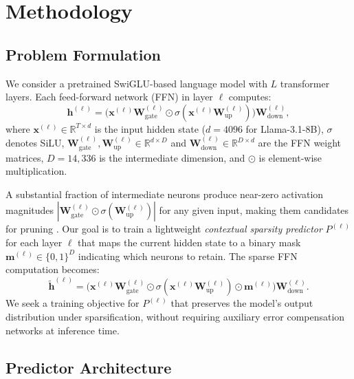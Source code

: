 \section{Methodology}
\label{sec:method}

\subsection{Problem Formulation}
\label{sec:method:formulation}

We consider a pretrained SwiGLU-based language model with $L$ transformer layers.
Each feed-forward network (FFN) in layer $\ell$ computes:
\begin{equation}
\mathbf{h}^{(\ell)} = \bigl(\mathbf{x}^{(\ell)} \mathbf{W}_{\text{gate}}^{(\ell)} \odot \sigma(\mathbf{x}^{(\ell)} \mathbf{W}_{\text{up}}^{(\ell)})\bigr) \mathbf{W}_{\text{down}}^{(\ell)},
\label{eq:swiglu}
\end{equation}
where $\mathbf{x}^{(\ell)} \in \mathbb{R}^{T \times d}$ is the input hidden state ($d{=}4096$ for Llama-3.1-8B), $\sigma$ denotes SiLU, $\mathbf{W}_{\text{gate}}^{(\ell)}, \mathbf{W}_{\text{up}}^{(\ell)} \in \mathbb{R}^{d \times D}$ and $\mathbf{W}_{\text{down}}^{(\ell)} \in \mathbb{R}^{D \times d}$ are the FFN weight matrices, $D{=}14{,}336$ is the intermediate dimension, and $\odot$ is element-wise multiplication.

A substantial fraction of intermediate neurons produce near-zero activation magnitudes $|\mathbf{W}_{\text{gate}}^{(\ell)} \odot \sigma(\mathbf{W}_{\text{up}}^{(\ell)})|$ for any given input, making them candidates for pruning \cite{placeholder_teal,placeholder_dejavu}.
Our goal is to train a lightweight \emph{contextual sparsity predictor} $P^{(\ell)}$ for each layer $\ell$ that maps the current hidden state to a binary mask $\mathbf{m}^{(\ell)} \in \{0,1\}^D$ indicating which neurons to retain.
The sparse FFN computation becomes:
\begin{equation}
\tilde{\mathbf{h}}^{(\ell)} = \bigl(\mathbf{x}^{(\ell)} \mathbf{W}_{\text{gate}}^{(\ell)} \odot \sigma(\mathbf{x}^{(\ell)} \mathbf{W}_{\text{up}}^{(\ell)}) \odot \mathbf{m}^{(\ell)}\bigr) \mathbf{W}_{\text{down}}^{(\ell)}.
\label{eq:sparse_ffn}
\end{equation}
We seek a training objective for $P^{(\ell)}$ that preserves the model's output distribution under sparsification, without requiring auxiliary error compensation networks at inference time.

\subsection{Predictor Architecture}
\label{sec:method:predictor}

